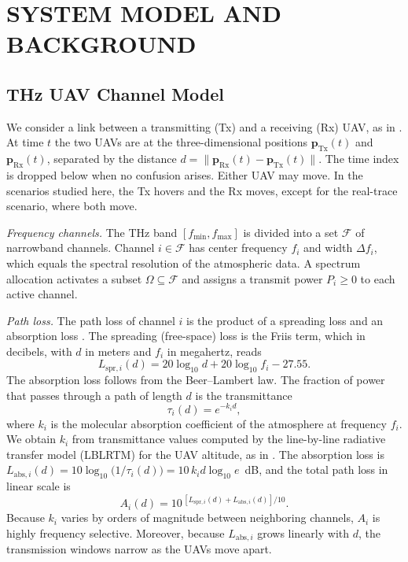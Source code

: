 \documentclass[correspondence]{IEEEtaes}
\begin{document}
\section{SYSTEM MODEL AND BACKGROUND}
\label{sec:system}
\subsection{THz UAV Channel Model}
\label{sec:channel}
We consider a link between a transmitting (Tx) and a receiving (Rx) UAV, as in
\cite{saeed2024maxactive}. At time $t$ the two UAVs are at the three-dimensional positions
$\mathbf{p}_{\mathrm{Tx}}(t)$ and $\mathbf{p}_{\mathrm{Rx}}(t)$, separated by the distance
$d=\|\mathbf{p}_{\mathrm{Rx}}(t)-\mathbf{p}_{\mathrm{Tx}}(t)\|$. The time index is dropped
below when no confusion arises. Either UAV may move. In the scenarios studied here, the
Tx hovers and the Rx moves, except for the real-trace scenario, where both move.

\emph{Frequency channels.} The THz band $[f_{\min},f_{\max}]$ is divided into a set
$\mathcal{F}$ of narrowband channels. Channel $i\in\mathcal{F}$ has center frequency $f_i$
and width $\Delta f_i$, which equals the spectral resolution of the atmospheric data. A
spectrum allocation activates a subset $\Omega\subseteq\mathcal{F}$ and assigns a transmit
power $P_i\ge0$ to each active channel.

\emph{Path loss.} The path loss of channel $i$ is the product of a spreading loss and an
absorption loss \cite{jornet2011channel}. The spreading (free-space) loss is the Friis
term, which in decibels, with $d$ in meters and $f_i$ in megahertz, reads
\begin{equation}
L_{\mathrm{spr},i}(d)=20\log_{10}d+20\log_{10}f_i-27.55 .
\label{eq:spread}
\end{equation}
The absorption loss follows from the Beer--Lambert law. The fraction of power that passes
through a path of length $d$ is the transmittance
\begin{equation}
\tau_i(d)=e^{-k_i d},
\label{eq:tau}
\end{equation}
where $k_i$ is the molecular absorption coefficient of the atmosphere at frequency $f_i$.
We obtain $k_i$ from transmittance values computed by the line-by-line radiative transfer
model (LBLRTM) \cite{clough2005aer} for the UAV altitude, as in
\cite{saeed2024maxactive}. The absorption loss is
$L_{\mathrm{abs},i}(d)=10\log_{10}\!\big(1/\tau_i(d)\big)=10\,k_i d\log_{10}e$~dB, and the
total path loss in linear scale is
\begin{equation}
A_i(d)=10^{\,[L_{\mathrm{spr},i}(d)+L_{\mathrm{abs},i}(d)]/10}.
\label{eq:pathloss}
\end{equation}
Because $k_i$ varies by orders of magnitude between neighboring channels, $A_i$ is highly
frequency selective. Moreover, because $L_{\mathrm{abs},i}$ grows linearly with $d$,
the transmission windows narrow as the UAVs move apart.
\end{document}
